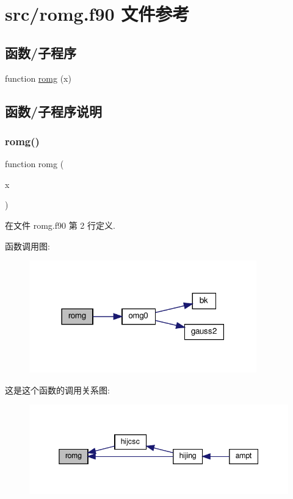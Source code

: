 \hypertarget{romg_8f90}{}\section{src/romg.f90 文件参考}
\label{romg_8f90}
\subsection*{函数/子程序}
\begin{DoxyCompactItemize}
\item 
function \mbox{\hyperlink{romg_8f90_a1e4e065a565e841d8a9eaa96750fb665}{romg}} (x)
\end{DoxyCompactItemize}


\subsection{函数/子程序说明}
\mbox{\label{romg_8f90_a1e4e065a565e841d8a9eaa96750fb665}} 
\subsubsection{\texorpdfstring{romg()}{romg()}}
{\footnotesize\ttfamily function romg (\begin{DoxyParamCaption}\item[{}]{x }\end{DoxyParamCaption})}



在文件 romg.\+f90 第 2 行定义.

函数调用图\+:
\nopagebreak
\begin{figure}[H]
\begin{center}
\leavevmode
\includegraphics[width=279pt]{romg_8f90_a1e4e065a565e841d8a9eaa96750fb665_cgraph}
\end{center}
\end{figure}
这是这个函数的调用关系图\+:
\nopagebreak
\begin{figure}[H]
\begin{center}
\leavevmode
\includegraphics[width=345pt]{romg_8f90_a1e4e065a565e841d8a9eaa96750fb665_icgraph}
\end{center}
\end{figure}
